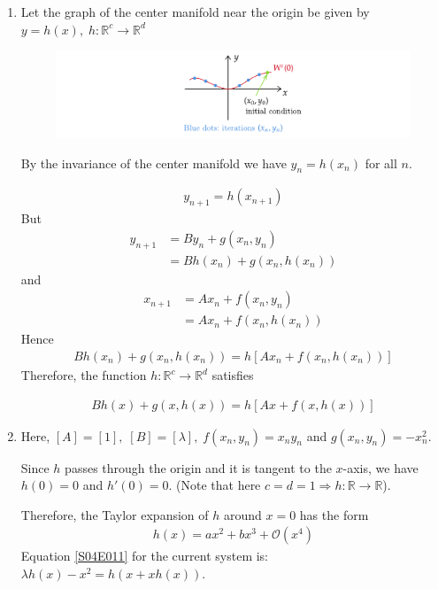 \begin{solution}[4.1]
\begin{enumerate}
\item Let the graph of the center manifold near the origin be given by $y = h(x), \; h:\mathbb{R}^c \rightarrow \mathbb{R}^d$
\begin{figure}[h]
	\centering
	\includegraphics[scale=0.9]{figures/solutions/ch4/S01D01.pdf}
\end{figure}
By the invariance of the center manifold we have $y_n = h(x_n)$ for all $n$.

\begin{align}
	y_{n+1} = h(x_{n+1})
\end{align}
But
\begin{align}
	y_{n+1} &= By_n + g(x_n, y_n) \\
	&= Bh(x_n) + g(x_n, h(x_n))
\end{align}
and
\begin{align}
	x_{n+1} &= Ax_n + f(x_n, y_n) \\
	&= Ax_n + f(x_n, h(x_n))
\end{align}
Hence
\begin{align}
	Bh(x_n) + g(x_n, h(x_n)) = h[Ax_n + f(x_n, h(x_n))]
\end{align}
Therefore, the function $h:\mathbb{R}^c \rightarrow \mathbb{R}^d$ satisfies

\begin{align}\label{S04E011}\boxed{
		Bh(x) + g(x, h(x)) = h[Ax + f(x, h(x))]
	}
\end{align}


\item Here, $[A] = [1],\; [B] = [\lambda], \; f(x_n,y_n) = x_ny_n$ and $g(x_n, y_n)=-x_n^2$.

Since $h$ passes through the origin and it is tangent to the $x$-axis, we have $h(0)=0$ and $h'(0)=0$. (Note that here $c=d=1 \Rightarrow h:\mathbb{R} \rightarrow \mathbb{R}$).

Therefore, the Taylor expansion of $h$ around $x=0$ has the form
\begin{align}\label{S04E012}
	h(x) = ax^2 + bx^3 + \mathcal{O}(x^4)
\end{align}
Equation \eqref{S04E011} for the current system is: $\lambda h(x) - x^2 = h(x + xh(x))$.


\end{enumerate}
\end{solution}
